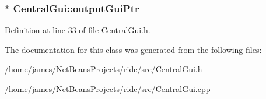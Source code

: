 \hypertarget{class_central_gui_a60c563767906a6db0c209f0b21437a09}{
\subsubsection[{output\-Gui\-Ptr}]{$\ast$ Central\-Gui\-::output\-Gui\-Ptr\hspace{0.3cm}{\ttfamily [private]}}}\label{class_central_gui_a60c563767906a6db0c209f0b21437a09}


Definition at line 33 of file Central\-Gui.\-h.



The documentation for this class was generated from the following files\-:\begin{DoxyCompactItemize}
\item 
/home/james/\-Net\-Beans\-Projects/ride/src/\hyperlink{_central_gui_8h}{Central\-Gui.\-h}\item 
/home/james/\-Net\-Beans\-Projects/ride/src/\hyperlink{_central_gui_8cpp}{Central\-Gui.\-cpp}\end{DoxyCompactItemize}
